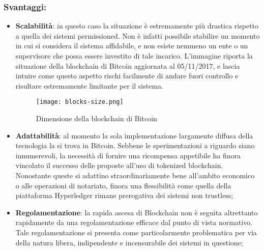 		\subsubsection{Svantaggi:}
			\begin{itemize}
				\item \textbf{Scalabilità}: in questo caso la situazione è estremamente più drastica rispetto a quella dei sistemi permissioned. Non è infatti possibile stabilire un momento in cui si considera il sistema affidabile, e non esiste nemmeno un ente o un supervisore che possa essere investito di tale incarico. L'immagine riporta la situazione della blockchain di Bitcoin aggiornata al 05/11/2017, e lascia intuire come questo aspetto rischi facilmente di andare fuori controllo e risultare estremamente limitante per il sistema.
				\begin{figure}[ht]
					\centering
					\texttt{[image: blocks-size.png]}
					\caption{Dimensione della blockchain di Bitcoin}
					\label{fig:blocks.size}
				\end{figure}
				\item \textbf{Adattabilità}: al momento la sola implementazione largamente diffusa della tecnologia la si trova in Bitcoin. Sebbene le sperimentazioni a riguardo siano innumerevoli, la necessità di fornire una ricompensa appetibile ha finora vincolato il successo delle proposte all'uso di tokenized blockchain. Nonostante queste si adattino straordinariamente bene all'ambito economico o alle operazioni di notariato, finora una flessibilità come quella della piattaforma Hyperledger rimane prerogativa dei sistemi non trustless;
				\item \textbf{Regolamentazione}: la rapida ascesa di Blockchain non è seguita altrettanto rapidamente da una regolamentazione efficace dal punto di vista normativo. Tale regolamentazione si presenta come particolarmente problematica per via della natura libera, indipendente e incensurabile dei sistemi in questione;

\end{itemize}
